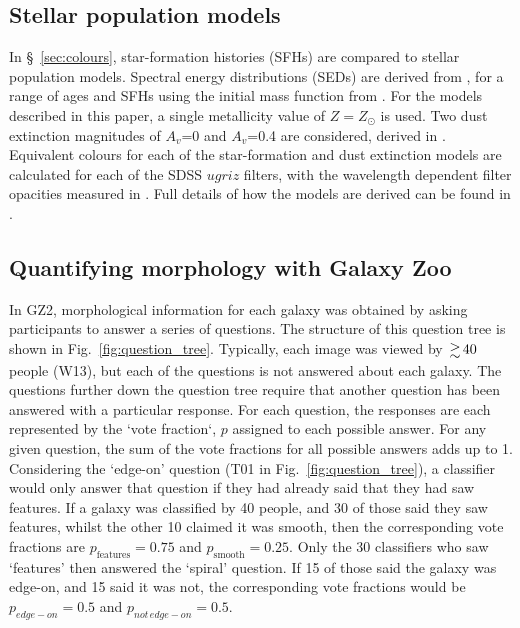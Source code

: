 \documentclass[useAMS,usenatbib]{mn2e}
\begin{document}
\subsection{Stellar population models}
\label{sec:SEDs}

In \S~\ref{sec:colours}, star-formation histories (SFHs) are compared to stellar population models. Spectral energy distributions (SEDs) are derived from \citet{BC_03}, for a range of ages and SFHs using the initial mass function from \citet{Chabrier_03}. For the models described in this paper, a single metallicity value of $Z=Z_{\odot}$ is used. Two dust extinction magnitudes of $A_v$=0 and $A_v$=0.4 are considered, derived in \citet{Calzetti_00}. Equivalent colours for each of the star-formation and dust extinction models are calculated for each of the SDSS $ugriz$ filters, with the wavelength dependent filter opacities measured in \citet{Doi_10}. Full details of how the models are derived can be found in \citet{Duncan_14}.
\subsection{Quantifying morphology with Galaxy Zoo}
\label{sec:gz_morphologies}

In GZ2, morphological information for each galaxy was obtained by asking participants to answer a series of questions. The structure of this question tree is shown in Fig.~\ref{fig:question_tree}. Typically, each image was viewed by $\ga 40$ people (W13), but each of the questions is not answered about each galaxy. The questions further down the question tree require that another question has been answered with a particular response. For each question, the responses are each represented by the `vote fraction`, $p$ assigned to each possible answer. For any given question, the sum of the vote fractions for all possible answers adds up to 1. Considering the `edge-on' question (T01 in Fig.~\ref{fig:question_tree}), a classifier would only answer that question if they had already said that they had saw features. If a galaxy was classified by 40 people, and 30 of those said they saw features, whilst the other 10 claimed it was smooth, then the corresponding vote fractions are $p_{\mathrm{features}}=0.75$ and $p_\mathrm{{smooth}}=0.25$. Only the 30 classifiers who saw `features' then answered the `spiral' question. If 15 of those said the galaxy was edge-on, and 15 said it was not, the corresponding vote fractions would be $p_{edge-on}=0.5$ and $p_{not \, edge-on}=0.5$. 
\end{document}

